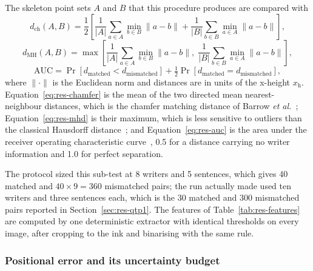 The skeleton point sets $A$ and $B$ that this procedure produces are compared with
\begin{equation}
\label{eq:res-chamfer}
d_{\mathrm{ch}}(A,B)=\frac{1}{2}\left[\frac{1}{\lvert A\rvert}\sum_{a\in A}\min_{b\in B}\lVert a-b\rVert+\frac{1}{\lvert B\rvert}\sum_{b\in B}\min_{a\in A}\lVert a-b\rVert\right],
\end{equation}
\begin{equation}
\label{eq:res-mhd}
d_{\mathrm{MH}}(A,B)=\max\left[\frac{1}{\lvert A\rvert}\sum_{a\in A}\min_{b\in B}\lVert a-b\rVert,\;\frac{1}{\lvert B\rvert}\sum_{b\in B}\min_{a\in A}\lVert a-b\rVert\right],
\end{equation}
\begin{equation}
\label{eq:res-auc}
\mathrm{AUC}=\Pr\left[d_{\mathrm{matched}}<d_{\mathrm{mismatched}}\right]+\tfrac{1}{2}\Pr\left[d_{\mathrm{matched}}=d_{\mathrm{mismatched}}\right],
\end{equation}
where $\lVert\cdot\rVert$ is the Euclidean norm and distances are in units of the x-height $x_{\mathrm{h}}$.
Equation~\ref{eq:res-chamfer} is the mean of the two directed mean nearest-neighbour distances, which is the chamfer matching distance of Barrow \emph{et al.}~\cite{barrow1977}; Equation~\ref{eq:res-mhd} is their maximum, which is less sensitive to outliers than the classical Hausdorff distance~\cite{dubuisson1994}; and Equation~\ref{eq:res-auc} is the area under the receiver operating characteristic curve~\cite{fawcett2006}, 0.5 for a distance carrying no writer information and 1.0 for perfect separation.

The protocol sized this sub-test at 8 writers and 5 sentences, which gives 40 matched and $40\times9=360$ mismatched pairs; the run actually made used ten writers and three sentences each, which is the 30 matched and 300 mismatched pairs reported in Section~\ref{sec:res-qtp1}.
The features of Table~\ref{tab:res-features} are computed by one deterministic extractor with identical thresholds on every image, after cropping to the ink and binarising with the same rule.

\subsubsection{Positional error and its uncertainty budget}


